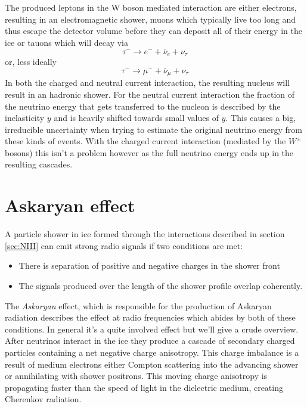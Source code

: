 The produced leptons in the W boson mediated interaction are either electrons,
resulting in an electromagnetic shower, muons which typically live
too long and thus escape the detector volume before they can deposit all of their 
energy in the ice\cite{PhdthesisWeling} or tauons which will decay via
\begin{equation}
	\tau^- \rightarrow e^- + \bar{\nu}_e + \nu_\tau
\end{equation}
or, less ideally
\begin{equation}
	\tau^- \rightarrow \mu^- + \bar{\nu}_\mu + \nu_\tau
\end{equation}
In both the charged and neutral current interaction, the resulting nucleus
will result in an hadronic shower. For the neutral current interaction
the fraction of the neutrino energy that gets transferred to
the nucleon is described by the inelasticity $y$ and is heavily shifted towards
small values of $y$\cite{elasticity_y}. This causes a big, irreducible
uncertainty when trying to estimate the original neutrino energy from these
kinds of events.  With the charged current interaction (mediated by the $W^\pm$
bosons) this isn't a problem however as the full neutrino energy ends up in the
resulting cascades.
\section{Askaryan effect}
\label{sec:Askaryan}
A particle shower in ice formed through the interactions described in section
\ref{sec:NIII} can emit strong radio signals if two conditions are met:
\begin{itemize}
	\item There is separation of positive and negative charges in the shower front 
	\item The signals produced over the length of the shower profile overlap coherently.
\end{itemize}
The \textit{Askaryan} \cite{Askaryan} effect, which is responsible for the
production of Askaryan radiation describes the effect at radio frequencies
which abides by both of these conditions.  In general it's a quite involved
effect but we'll give a crude overview. After neutrinos interact in the ice
they produce a cascade of secondary charged particles containing a net negative
charge anisotropy\cite{Connolly_2017}.  This charge imbalance is a result of
medium electrons either Compton scattering into the advancing shower or
annihilating with shower positrons.  This moving charge anisotropy is
propagating faster than the speed of light in the dielectric medium, creating
Cherenkov radiation.  


